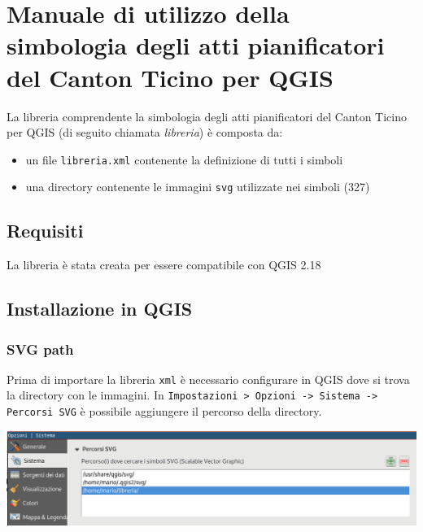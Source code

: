 \documentclass[11pt]{article}
\date{\today}
\title{}
\begin{document}
\tableofcontents

\section{Manuale di utilizzo della simbologia degli atti pianificatori del Canton Ticino per QGIS}
\label{sec:org21e8739}
La libreria comprendente la simbologia degli atti pianificatori del Canton
Ticino per QGIS (di seguito chiamata \emph{libreria}) è composta da:
\begin{itemize}
\item un file \texttt{libreria.xml} contenente la definizione di tutti i simboli
\item una directory contenente le immagini \texttt{svg} utilizzate nei simboli (327)
\end{itemize}
\subsection{Requisiti}
\label{sec:orgec07082}
La libreria è stata creata per essere compatibile con QGIS 2.18
\subsection{Installazione in QGIS}
\label{sec:org31e6c7c}
\subsubsection{SVG path}
\label{sec:org3ba5c3e}
Prima di importare la libreria \texttt{xml} è necessario configurare in QGIS dove si
trova la directory con le immagini. 
In \texttt{Impostazioni > Opzioni -> Sistema -> Percorsi SVG} è possibile aggiungere il percorso
della directory.
\begin{center}
\includegraphics[width=.9\linewidth]{./path_svg.png}
\end{center}
\end{document}
